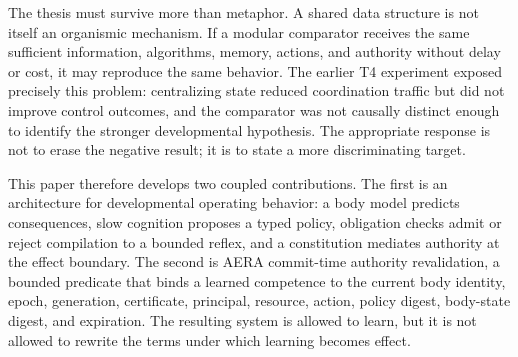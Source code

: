 \documentclass[journal,10pt]{IEEEtran}
\newcommand{\AERA}{\textsc{AERA}}
\begin{document}
The thesis must survive more than metaphor. A shared data structure is not itself an organismic mechanism. If a modular comparator receives the same sufficient information, algorithms, memory, actions, and authority without delay or cost, it may reproduce the same behavior. The earlier T4 experiment exposed precisely this problem: centralizing state reduced coordination traffic but did not improve control outcomes, and the comparator was not causally distinct enough to identify the stronger developmental hypothesis. The appropriate response is not to erase the negative result; it is to state a more discriminating target.

This paper therefore develops two coupled contributions. The first is an architecture for developmental operating behavior: a body model predicts consequences, slow cognition proposes a typed policy, obligation checks admit or reject compilation to a bounded reflex, and a constitution mediates authority at the effect boundary. The second is \AERA{} commit-time authority revalidation, a bounded predicate that binds a learned competence to the current body identity, epoch, generation, certificate, principal, resource, action, policy digest, body-state digest, and expiration. The resulting system is allowed to learn, but it is not allowed to rewrite the terms under which learning becomes effect.
\end{document}
